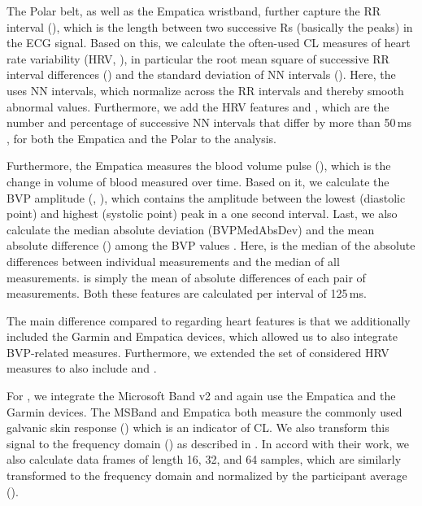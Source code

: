 \documentclass[output=paper]{langsci/langscibook}
\begin{document}
The Polar belt, as well as the Empatica wristband, further capture the RR interval (\rr{}{}), which is the length between two successive Rs (basically the peaks) in the ECG signal.
Based on this, we calculate the often-used CL measures of heart rate variability (HRV, \citealt{rowe1998heart}), in particular the root mean square of successive RR interval differences (\rmssd{}{}) and the standard deviation of NN intervals (\sdnn{}{}). Here, the \sdnn{}{} uses NN intervals, which normalize across the RR intervals and thereby smooth abnormal values.
Furthermore, we add the HRV features \nn{}{} and \pnn{}{}, which are the number and percentage of successive NN intervals that differ by more than 50\,ms \citep{shaffer2017overview}, for both the Empatica and the Polar to the analysis.

Furthermore, the Empatica measures the blood volume pulse (\bvpempatica{}), which is the change in volume of blood measured over time. Based on it, we calculate the BVP amplitude (\bvpamplitudeempatica{}, \citealt{iani2004effects}), which contains the amplitude between the lowest (diastolic point) and highest (systolic point) peak in a one second interval. Last, we also calculate the median absolute deviation (BVPMed\-AbsDev) and the mean absolute difference (\bvpmeanadempatica{}) among the BVP values \citep{haapalainen2010psycho}. Here, \bvpmedadempatica{} is the median of the absolute differences between individual measurements and the median of all measurements. \bvpmeanadempatica{} is simply the mean of absolute differences of each pair of measurements. Both these features are calculated per interval of 125\,ms.

The main difference compared to \citet{herbig2019mt} regarding heart features is that we additionally included the Garmin and Empatica devices, which allowed us to also integrate BVP-related measures. Furthermore, we extended the set of considered HRV measures to also include \nn{}{} and \pnn{}{}.


For , we integrate the Microsoft Band v2 and again use the Empatica and the Garmin devices.
The MSBand and Empatica both measure the commonly used galvanic skin response (\gsr{}{}) which is an indicator of CL. We also transform this signal to the frequency domain (\freqgsr{}{}) as described in \citet{chen2016robust}. In accord with their work, we also calculate data frames of length 16, 32, and 64 samples, which are similarly transformed to the frequency domain and normalized by the participant average (\freqframegsr{}{}).
\end{document}

